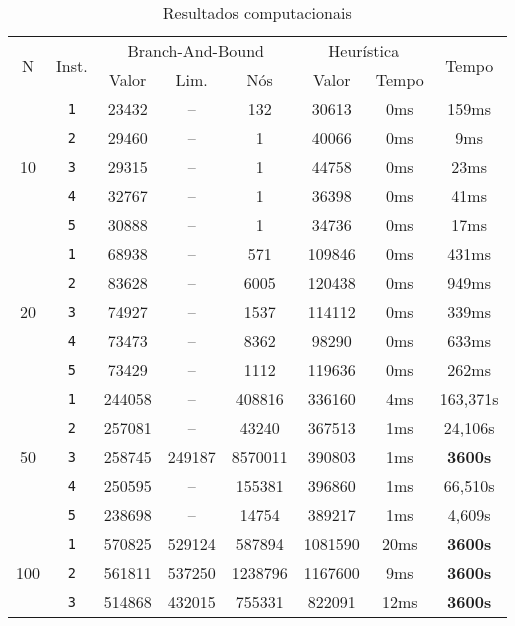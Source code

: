\documentclass{article}
\begin{document}
\begin{table}[ht]
    \centering
    \begin{tabular}{c|c|c|c|c|c|c|c}
        \hline
        \multirow{2}{0.6cm}{N}&\multirow{2}{1cm}{Inst.} & \multicolumn{3}{c|}{Branch-And-Bound} & \multicolumn{2}{c|}{Heurística} & \multirow{2}{1.15cm}{Tempo}\\
        \cline{3-7}
        &&Valor & Lim. & Nós & Valor & Tempo \\
        \hline\hline

        \multirow{5}{0.6cm}{10}
        &{\tt 1} & 23432 & -- & 132 & 30613 & 0ms & 159ms\\
        &{\tt 2} & 29460 & -- & 1 & 40066 & 0ms & 9ms \\
        &{\tt 3} & 29315 & -- & 1 & 44758 & 0ms & 23ms \\
        &{\tt 4} & 32767 & -- & 1 & 36398 & 0ms & 41ms \\
        &{\tt 5} & 30888 & -- & 1 & 34736 & 0ms & 17ms \\

        \hline\multirow{5}{0.6cm}{20}
        &{\tt 1} & 68938 & -- & 571 & 109846 & 0ms & 431ms\\
        &{\tt 2} & 83628 & -- & 6005 & 120438 & 0ms & 949ms \\
        &{\tt 3} & 74927 & -- & 1537 & 114112 & 0ms & 339ms \\
        &{\tt 4} & 73473 & -- & 8362 & 98290 & 0ms & 633ms \\
        &{\tt 5} & 73429 & -- & 1112 & 119636 & 0ms & 262ms\\

        \hline\multirow{5}{0.6cm}{50}
        &{\tt 1} & 244058 & -- & 408816 & 336160 & 4ms & 163,371s\\
        &{\tt 2} & 257081 & -- & 43240 & 367513 & 1ms & 24,106s \\
        &{\tt 3} & 258745 & 249187 & 8570011 & 390803 & 1ms & {\bf 3600s} \\
        &{\tt 4} & 250595 & -- & 155381 & 396860 & 1ms & 66,510s \\
        &{\tt 5} & 238698 & -- & 14754 & 389217 & 1ms & 4,609s\\

        \hline\multirow{3}{0.6cm}{100}
        &{\tt 1} & 570825 & 529124 & 587894 & 1081590 & 20ms & {\bf 3600s}\\
        &{\tt 2} & 561811 & 537250 & 1238796 & 1167600 & 9ms & {\bf 3600s}\\
        &{\tt 3} & 514868 & 432015 & 755331 & 822091 & 12ms & {\bf 3600s} \\\hline
    \end{tabular}
    \caption{Resultados computacionais}
    \label{tab:computational-results}
\end{table}
\end{document}
